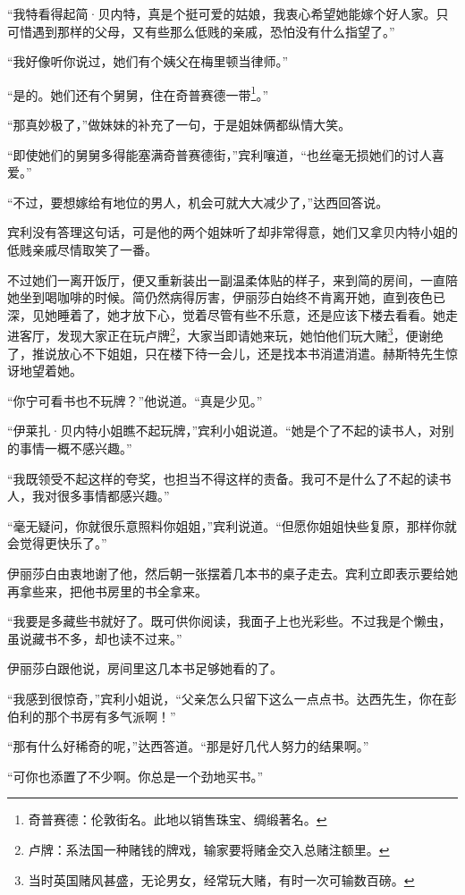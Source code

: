 \par “我特看得起简·贝内特，真是个挺可爱的姑娘，我衷心希望她能嫁个好人家。只可惜遇到那样的父母，又有些那么低贱的亲戚，恐怕没有什么指望了。”
\par “我好像听你说过，她们有个姨父在梅里顿当律师。”
\par “是的。她们还有个舅舅，住在奇普赛德一带\footnote{奇普赛德：伦敦街名。此地以销售珠宝、绸缎著名。}。”
\par “那真妙极了，”做妹妹的补充了一句，于是姐妹俩都纵情大笑。
\par “即使她们的舅舅多得能塞满奇普赛德街，”宾利嚷道，“也丝毫无损她们的讨人喜爱。”
\par “不过，要想嫁给有地位的男人，机会可就大大减少了，”达西回答说。
\par 宾利没有答理这句话，可是他的两个姐妹听了却非常得意，她们又拿贝内特小姐的低贱亲戚尽情取笑了一番。
\par 不过她们一离开饭厅，便又重新装出一副温柔体贴的样子，来到简的房间，一直陪她坐到喝咖啡的时候。简仍然病得厉害，伊丽莎白始终不肯离开她，直到夜色已深，见她睡着了，她才放下心，觉着尽管有些不乐意，还是应该下楼去看看。她走进客厅，发现大家正在玩卢牌\footnote{卢牌：系法国一种赌钱的牌戏，输家要将赌金交入总赌注额里。}，大家当即请她来玩，她怕他们玩大赌\footnote{当时英国赌风甚盛，无论男女，经常玩大赌，有时一次可输数百磅。}，便谢绝了，推说放心不下姐姐，只在楼下待一会儿，还是找本书消遣消遣。赫斯特先生惊讶地望着她。
\par “你宁可看书也不玩牌？”他说道。“真是少见。”
\par “伊莱扎·贝内特小姐瞧不起玩牌，”宾利小姐说道。“她是个了不起的读书人，对别的事情一概不感兴趣。”
\par “我既领受不起这样的夸奖，也担当不得这样的责备。我可不是什么了不起的读书人，我对很多事情都感兴趣。”
\par “毫无疑问，你就很乐意照料你姐姐，”宾利说道。“但愿你姐姐快些复原，那样你就会觉得更快乐了。”
\par 伊丽莎白由衷地谢了他，然后朝一张摆着几本书的桌子走去。宾利立即表示要给她再拿些来，把他书房里的书全拿来。
\par “我要是多藏些书就好了。既可供你阅读，我面子上也光彩些。不过我是个懒虫，虽说藏书不多，却也读不过来。”
\par 伊丽莎白跟他说，房间里这几本书足够她看的了。
\par “我感到很惊奇，”宾利小姐说，“父亲怎么只留下这么一点点书。达西先生，你在彭伯利的那个书房有多气派啊！”
\par “那有什么好稀奇的呢，”达西答道。“那是好几代人努力的结果啊。”
\par “可你也添置了不少啊。你总是一个劲地买书。”
